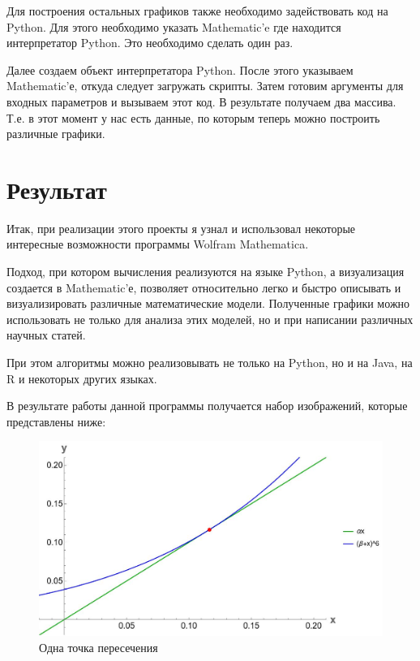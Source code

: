 \documentclass[14pt]{extarticle}
\begin{document}
        Для построения остальных графиков также необходимо задействовать код на Python. Для этого необходимо указать Mathematic'e где находится интерпретатор Python. Это необходимо сделать один раз. 
        
        Далее создаем объект интерпретатора Python. После этого указываем Mathematic'е, откуда следует загружать скрипты. Затем готовим аргументы для входных параметров и вызываем этот код. В результате получаем два массива. Т.е. в этот момент у нас есть данные, по которым теперь можно построить различные графики.

    \section*{\centering Результат}

        Итак, при реализации этого проекты я узнал и использовал некоторые интересные возможности программы Wolfram Mathematica.

        Подход, при котором вычисления реализуются на языке Python, а визуализация создается в Mathematic'е, позволяет относительно легко и быстро описывать и визуализировать различные математические модели. Полученные графики можно использовать не только для анализа этих моделей, но и при написании различных научных статей.

        При этом алгоритмы можно реализовывать не только на Python, но и на Java, на R и некоторых других языках.

        В результате работы данной программы получается набор изображений, которые представлены ниже:

        \begin{figure}[ht]
            \centering
            \includegraphics[width=\textwidth]{images/one_intersection.jpg}
            \caption{Одна точка пересечения}
        \end{figure}
\end{document}
